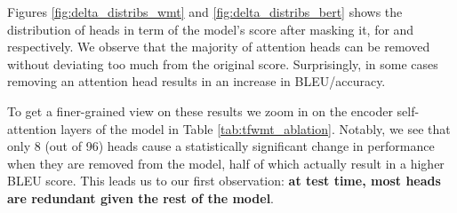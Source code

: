 Figures \ref{fig:delta_distribs_wmt} and \ref{fig:delta_distribs_bert} shows the distribution of heads in term of the model's score after masking it, for \tfwmt{} and \bertmnli{} respectively. We observe that the majority of attention heads can be removed without deviating too much from the original score. Surprisingly, in some cases removing an attention head results in an increase in BLEU/accuracy.




To get a finer-grained view on these results we zoom in on the encoder self-attention layers of the \tfwmt{} model in Table \ref{tab:tfwmt_ablation}. Notably, we see that only 8 (out of 96) heads cause a statistically significant change in performance when they are removed from the model, half of which actually result in a higher BLEU score. This leads us to our first observation: \textbf{at test time, most heads are redundant given the rest of the model}.



